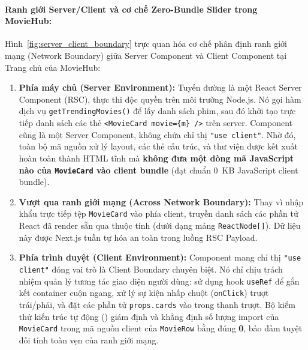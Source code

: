 \documentclass[12pt,a4paper]{extarticle}
\begin{document}
\paragraph*{Ranh giới Server/Client và cơ chế Zero-Bundle Slider trong MovieHub:}
Hình~\ref{fig:server_client_boundary} trực quan hóa cơ chế phân định ranh giới mạng (Network Boundary) giữa Server Component và Client Component tại Trang chủ của MovieHub:
\begin{enumerate}[noitemsep]
    \item \textbf{Phía máy chủ (Server Environment):} Tuyến đường  là một React Server Component (RSC), thực thi độc quyền trên môi trường Node.js. Nó gọi hàm dịch vụ \texttt{getTrendingMovies()} để lấy danh sách phim, sau đó khởi tạo trực tiếp danh sách các thẻ \texttt{<MovieCard movie=\{m\} />} trên server. Component  cũng là một Server Component, không chứa chỉ thị \texttt{"use client"}. Nhờ đó, toàn bộ mã nguồn xử lý layout, các thẻ cấu trúc, và thư viện  được kết xuất hoàn toàn thành HTML tĩnh mà \textbf{không đưa một dòng mã JavaScript nào của \texttt{MovieCard} vào client bundle} (đạt chuẩn 0~KB JavaScript client bundle).
    \item \textbf{Vượt qua ranh giới mạng (Across Network Boundary):} Thay vì nhập khẩu trực tiếp tệp \texttt{MovieCard} vào phía client,  truyền danh sách các phần tử React đã render sẵn qua thuộc tính  (dưới dạng mảng \texttt{ReactNode[]}). Dữ liệu này được Next.js tuần tự hóa an toàn trong luồng RSC Payload.
    \item \textbf{Phía trình duyệt (Client Environment):} Component  mang chỉ thị \texttt{"use client"} đóng vai trò là Client Boundary chuyên biệt. Nó chỉ chịu trách nhiệm quản lý tương tác giao diện người dùng: sử dụng hook \texttt{useRef} để gắn kết container cuộn ngang, xử lý sự kiện nhấp chuột (\texttt{onClick}) trượt trái/phải, và đặt các phần tử \texttt{props.cards} vào trong thanh trượt. Bộ kiểm thử kiến trúc tự động () giám định và khẳng định số lượng import của \texttt{MovieCard} trong mã nguồn client của \texttt{MovieRow} bằng đúng \textbf{0}, bảo đảm tuyệt đối tính toàn vẹn của ranh giới mạng.
\end{enumerate}
\end{document}
